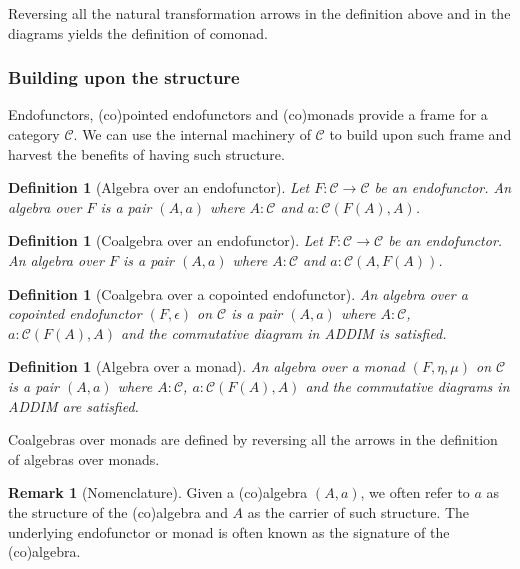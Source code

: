 \documentclass[12pt,a4paper,openright,twoside]{report}
\theoremstyle{plain}
\newtheorem{definition}[proposition]{Definition}
\theoremstyle{definition}
\newtheorem{remark}[proposition]{Remark}
\begin{document}
Reversing all the natural transformation arrows in the definition above and in the diagrams yields the definition of comonad.


\subsubsection{Building upon the structure}

Endofunctors, (co)pointed endofunctors and (co)monads provide a frame for a category $\mathcal{C}$. We can use the internal machinery of $\mathcal{C}$ to build upon such frame and harvest the benefits of having such structure.

\begin{definition}[Algebra over an endofunctor]
  \label{def: endalg}
  Let $F: \mathcal{C} \to \mathcal{C}$ be an endofunctor. An algebra over $F$ is a pair $(A,a)$ where $A: \mathcal{C}$ and $a:\mathcal{C}(F(A),A)$.
\end{definition}

\begin{definition}[Coalgebra over an endofunctor]
  \label{def: endcoalg}
  Let $F: \mathcal{C} \to \mathcal{C}$ be an endofunctor. An algebra over $F$ is a pair $(A,a)$ where $A: \mathcal{C}$ and $a:\mathcal{C}(A,F(A))$.
\end{definition}

\begin{definition}[Coalgebra over a copointed endofunctor]
  \label{def: copendcoalg}
  An algebra over a copointed endofunctor $(F, \epsilon)$ on $\mathcal{C}$ is a pair $(A,a)$ where $A: \mathcal{C}$, $a:\mathcal{C}(F(A),A)$ and the commutative diagram in ADDIM is satisfied.
\end{definition}

\begin{definition}[Algebra over a monad]
  \label{def: monalg}
  An algebra over a monad $(F, \eta, \mu)$ on $\mathcal{C}$ is a pair $(A,a)$ where $A: \mathcal{C}$, $a:\mathcal{C}(F(A),A)$ and the commutative diagrams in ADDIM are satisfied.
\end{definition}

Coalgebras over monads are defined by reversing all the arrows in the definition of algebras over monads.

\begin{remark}[Nomenclature]
  Given a (co)algebra $(A, a)$, we often refer to $a$ as the structure of the (co)algebra and $A$ as the carrier of such structure. The underlying endofunctor or monad is often known as the signature of the (co)algebra.
\end{remark}
\end{document}

